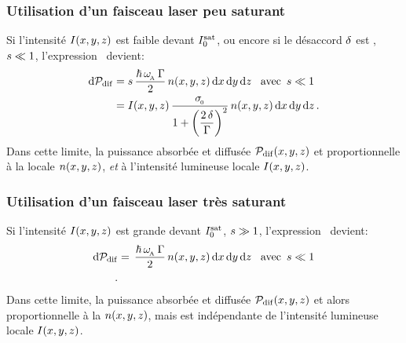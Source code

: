 \EnFaitNon
{%
\subsubsection{Utilisation d'un faisceau laser peu saturant}

Si l'intensité ${{I}(x,y,z)}$ est faible devant \lintsat ${I^{\rm sat}_{0}}$, ou encore si le désaccord ${\delta}$ est , \ie ${s} \ll 1$, l'expression~ devient:
\begin{align}
	\Diff{\Pdif} & =
	\sat
	\, \frac{\hbar\,\pulsReso\,\pulsSpont}{2} 
	\, \densxyz\,\dxyz
	\,\,\,\,\, \mbox{avec} \,\,\, \sat \ll 1
	\nonumber \\
	& = 
	\Ixyz
	\, \frac{\seceff}{1 + \left(\dfrac{2\,\desac}{\pulsSpont}\right)^2}
	\, \densxyz\,\dxyz
	\pointformule
	\label{eq:PdifBasseInt}
\end{align}
Dans cette limite, la puissance absorbée et diffusée ${\mathcal{P}_{\rm dif}(x,y,z)}$ et proportionnelle à la \dat locale ${{n}(x,y,z)}$, \emph{et} à l'intensité lumineuse locale ${{I}(x,y,z)}$.

\subsubsection{Utilisation d'un faisceau laser très saturant}
Si l'intensité ${{I}(x,y,z)}$ est grande devant \lintsat ${I^{\rm sat}_{0}}$, \ie ${s} \gg 1$, l'expression~ devient:
\begin{align}
	\Diff{\Pdif} & =
	\, \frac{\hbar\,\pulsReso\,\pulsSpont}{2} 
	\, \densxyz\,\dxyz
	\,\,\,\,\, \mbox{avec} \,\,\, \sat \ll 1
	\nonumber \\
	\pointformule
	\label{eq:PdifHauteInt}
\end{align}
Dans cette limite, la puissance absorbée et diffusée ${\mathcal{P}_{\rm dif}(x,y,z)}$ et alors proportionnelle à la \dat ${{n}(x,y,z)}$, mais est indépendante de l'intensité lumineuse locale ${{I}(x,y,z)}$.
}


